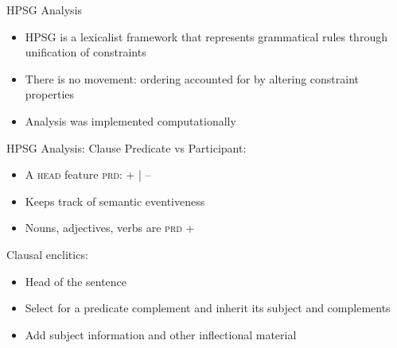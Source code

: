 \begin{comment}
\begin{frame}[fragile]{Clause: Summary}
\begin{itemize}
\item Clause: Predicate =inflection (participants)
\item Nouns, verbs, and adjectives can be predicates or participants
\item Some verbs are second-position suffixes
\item Modifiers precede what they modify, second position elements move accordingly
\end{itemize}

\begin{table}[]
\centering
\label{tab:2p}
\caption {Summary of second positions}
\adjustbox{max width=\textwidth}{
\begin{tabular}{llll}
 & \textbf{Syntactic domain} & \textbf{Attaches to} & \textbf{Meaning} \\ \hline
\textbf{Clausal enclitics} & Clause & First (non-extracted) word & tense, subject, mood \\ \hline
\textbf{Main predicate suffixes} & VP & First word in object (noun or adj) & transitive verbs \\ \hline
\textbf{Auxiliary predicate suffixes} & VP & First word in object (pred or adv) & modal-like verbs
\end{tabular}
}
\end{table}
	
\end{frame}
\end{comment}

\begin{frame}{HPSG Analysis}
\begin{itemize}
\item HPSG is a lexicalist framework that represents grammatical rules through unification of constraints
\item There is no movement: ordering accounted for by altering constraint properties
\item Analysis was implemented computationally
\end{itemize}
\end{frame}

\begin{frame}{HPSG Analysis: Clause}
Predicate vs Participant:
\begin{itemize}
\item A \textsc{head} feature \textsc{prd}: + | --
\item Keeps track of semantic eventiveness
\item Nouns, adjectives, verbs are \textsc{prd} +
\end{itemize}

Clausal enclitics:
\begin{itemize}
\item Head of the sentence
\item Select for a predicate complement and inherit its subject and complements
\item Add subject information and other inflectional material
\end{itemize}
\end{frame}

